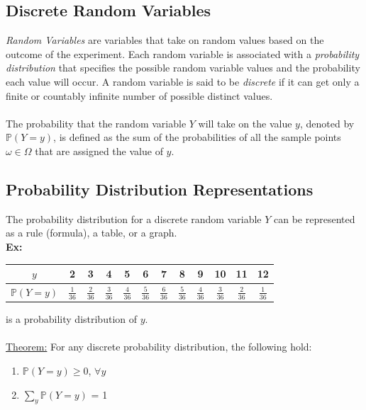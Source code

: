 \documentclass{article}
\newcommand{\ti}[1]{\textit{#1}}
\newcommand{\bbP}{\mathbb{P}}
\newcommand{\Om}{\Omega}
\newcommand{\om}{\omega}
\begin{document}
\subsection{Discrete Random Variables}
\ti{Random Variables} are variables that take on random values based on the outcome of the experiment. Each random variable is associated with a \ti{probability distribution} that specifies the possible random variable values and the probability each value will occur. A random variable is said to be \ti{discrete} if it can get only a finite or countably infinite number of possible distinct values.\\\\
The probability that the random variable $Y$ will take on the value $y$, denoted by $\bbP(Y=y)$, is defined as the sum of the probabilities of all the sample points $\om \in \Om$ that are assigned the value of $y$.
\subsection{Probability Distribution Representations}
The probability distribution for a discrete random variable $Y$ can be represented as a rule (formula), a table, or a graph. \\
\textbf{Ex: }
\begin{center}
\begin{tabular}{| c || c | c | c | c | c | c | c | c | c | c | c |}
\hline
$y$ & 2 & 3 & 4 & 5 & 6 & 7 & 8 & 9 & 10 & 11 & 12\\
\hline
$\bbP(Y=y)$ & $\frac{1}{36}$ & $\frac{2}{36}$ & $\frac{3}{36}$ & $\frac{4}{36}$ & $\frac{5}{36}$ & $\frac{6}{36}$ & $\frac{5}{36}$ & $\frac{4}{36}$ & $\frac{3}{36}$ & $\frac{2}{36}$ & $\frac{1}{36}$\\
\hline
\end{tabular}
\end{center}
is a probability distribution of $y$.\\\\
\underline{Theorem:} For any discrete probability distribution, the following hold:
\begin{enumerate}
	\item $\bbP(Y=y) \geq 0$, $\forall y$
	\item $\sum_{y} \bbP(Y=y)$ = 1
\end{enumerate}
\end{document}
